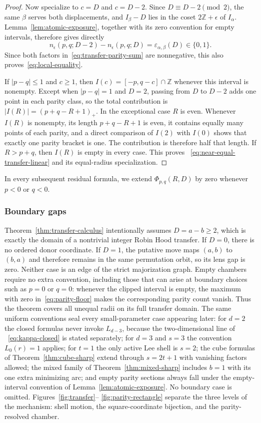 \documentclass[pdflatex,sn-mathphys-num]{sn-jnl}
\theoremstyle{thmstyleone}
\theoremstyle{thmstylethree}
\theoremstyle{thmstyletwo}
\newcommand{\Z}{\mathbb Z}
\begin{document}
\begin{proof}
Now specialize to $c=D$ and $c=D-2$.  Since $D\equiv D-2\pmod2$, the same
$\beta$ serves both displacements, and $I_\beta-D$ lies in the coset
$2\Z+\epsilon$ of $I_\alpha$.  Lemma~\ref{lem:atomic-exposure}, together
with its zero convention for empty intervals, therefore gives directly
\[
 n_\epsilon(p,q;D-2)-n_\epsilon(p,q;D)
 =\varepsilon_{\alpha,\beta}(D)\in\{0,1\}.
\]
Since both factors in~\eqref{eq:transfer-parity-sum} are nonnegative, this also
proves~\eqref{eq:local-equality}.

If $|p-q|\le1$ and $c\ge1$, then
$I(c)=[-p,q-c]\cap\Z$ whenever this interval is nonempty.  Except when
$|p-q|=1$ and $D=2$, passing from $D$ to $D-2$ adds one point in each parity
class, so the total contribution is $|I(R)|=(p+q-R+1)_+$.  In the exceptional
case $R$ is even.  Whenever $I(R)$ is nonempty, its length
$p+q-R+1$ is even, it contains equally many points of each parity, and a
direct comparison of $I(2)$ with $I(0)$ shows that exactly one parity bracket
is one.  The contribution is therefore half that length.  If $R>p+q$, then
$I(R)$ is empty in every case.  This proves
 ~\eqref{eq:near-equal-transfer-linear} and its equal-radius specialization.
\end{proof}

In every subsequent residual formula, we extend
$\Phi_{p,q}(R,D)$ by zero whenever $p<0$ or $q<0$.

\subsubsection{Boundary gaps}
Theorem~\ref{thm:transfer-calculus} intentionally assumes $D=a-b\ge2$,
which is exactly the domain of a nontrivial integer Robin Hood transfer.  If
$D=0$, there is no ordered donor coordinate.  If $D=1$, the putative move
maps $(a,b)$ to $(b,a)$ and therefore remains in the same permutation orbit,
so its lens gap is zero.  Neither case is an edge of the strict majorization
graph.  Empty chambers require no extra convention, including those that can
arise at boundary choices such as $p=0$ or $q=0$: whenever the clipped
interval is empty, the maximum with zero in~\eqref{eq:parity-floor} makes the
corresponding parity count vanish.  Thus the theorem covers all unequal
radii on its full transfer domain.  The same uniform conventions seal every
small-parameter case appearing later: for $d=2$ the closed formulas never
invoke $L_{d-3}$, because the two-dimensional line of
~\eqref{eq:kappa-closed} is stated separately; for $d=3$ and $s=3$ the
convention $L_0(r)=1$ applies; for $t=1$ the only active Lee shell is
$s=2$; the cube formulas of Theorem~\ref{thm:cube-sharp} extend through
$s=2t+1$ with vanishing factors allowed; the mixed family of
Theorem~\ref{thm:mixed-sharp} includes $b=1$ with its one extra minimizing
arc; and empty parity sections always fall under the empty-interval
convention of Lemma~\ref{lem:atomic-exposure}.  No boundary case is
omitted.  Figures~\ref{fig:transfer}--
\ref{fig:parity-rectangle} separate the three levels of the mechanism: shell
motion, the square-coordinate bijection, and the parity-resolved chamber.
\end{document}
